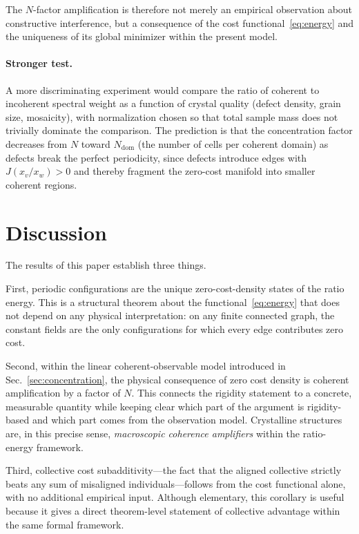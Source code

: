 \documentclass[prb,twocolumn,nofootinbib,superscriptaddress]{revtex4-2}
\newcommand{\J}{J}
\begin{document}
The $N$-factor amplification is therefore not merely an empirical observation about constructive interference, but a consequence of the cost functional~\eqref{eq:energy} and the uniqueness of its global minimizer within the present model.

\paragraph{Stronger test.}
A more discriminating experiment would compare the ratio of coherent to incoherent spectral weight as a function of crystal quality (defect density, grain size, mosaicity), with normalization chosen so that total sample mass does not trivially dominate the comparison.
The prediction is that the concentration factor decreases from $N$ toward $N_{\text{dom}}$ (the number of cells per coherent domain) as defects break the perfect periodicity, since defects introduce edges with $\J(x_v/x_w) > 0$ and thereby fragment the zero-cost manifold into smaller coherent regions.

\section{Discussion}
\label{sec:discussion}

The results of this paper establish three things.

First, periodic configurations are the unique zero-cost-density states of the ratio energy.
This is a structural theorem about the functional~\eqref{eq:energy} that does not depend on any physical interpretation: on any finite connected graph, the constant fields are the only configurations for which every edge contributes zero cost.

Second, within the linear coherent-observable model introduced in Sec.~\ref{sec:concentration}, the physical consequence of zero cost density is coherent amplification by a factor of $N$.
This connects the rigidity statement to a concrete, measurable quantity while keeping clear which part of the argument is rigidity-based and which part comes from the observation model.
Crystalline structures are, in this precise sense, \emph{macroscopic coherence amplifiers} within the ratio-energy framework.

Third, collective cost subadditivity---the fact that the aligned collective strictly beats any sum of misaligned individuals---follows from the cost functional alone, with no additional empirical input.
Although elementary, this corollary is useful because it gives a direct theorem-level statement of collective advantage within the same formal framework.
\end{document}
